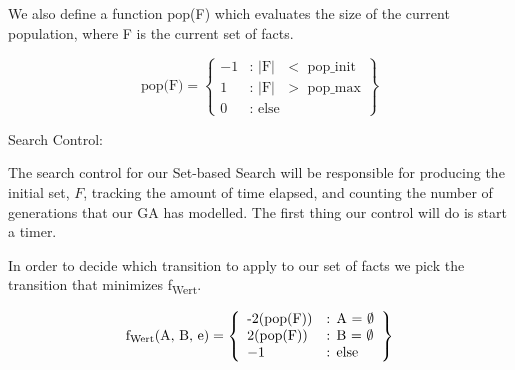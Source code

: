 \documentclass[11pt, oneside]{article}   	%
\begin{document}
\noindent We also define a function pop(F) which evaluates the size of the current population, where F is the current set of facts.

    \[
        \text{pop(F)} = \left\{\begin{array}{ll}
            -1 & \text{: $\vert$F$\vert$ $<$ pop_init}\\
            1 & \text{: $\vert$F$\vert$ $>$ pop_max}\\
            0 & \text{: else}
            \end{array}\right\}
      \]

\begin{comment}
\noindent Here we define the function, reduce($F$), which will be used in Ext to reduce the size a generation that has become too large. The removal of individuals from the population will be performed quasi-randomly via the select($F$) function, in order to avoid implementing an elitist GA.\\\\
reduce($F$) \{
\begin{algorithmic}[\textfloatsep = 0pt]
    \IF {$\vert F \vert$ \% 2 == 0}
    	\STATE target_size = $\dfrac{\vert F \vert}{2}$
    \ELSE
    	\STATE target_size = $\dfrac{\vert F \vert + 1}{2}$
    \ENDIF
    \STATE $i$ = 0
    \WHILE {$i <$ target_size}
    	\STATE individual = select($F$)
	\STATE $F$ = $F$ - individual
	\STATE $i$ ++ 1
    \ENDWHILE \\ \}
\end{algorithmic}
\end{comment}

\noindent Search Control:

\noindent The search control for our Set-based Search will be responsible for producing the initial set, $F$, tracking the amount of time elapsed, and counting the number of generations that our GA has modelled. The first thing our control will do is start a timer.

\noindent In order to decide which transition to apply to our set of facts we pick the transition that minimizes f\textsubscript{Wert}.

    \[
        \text{f\textsubscript{Wert}(A, B, e)} = \left\{\begin{array}{ll}
            \text{-2(pop(F))} & \text{: A = $\emptyset$}\\
            \text{2(pop(F))} & \text{: B = $\emptyset$}\\
            -1 & \text{: else}
            \end{array}\right\}
      \]
\end{document}
